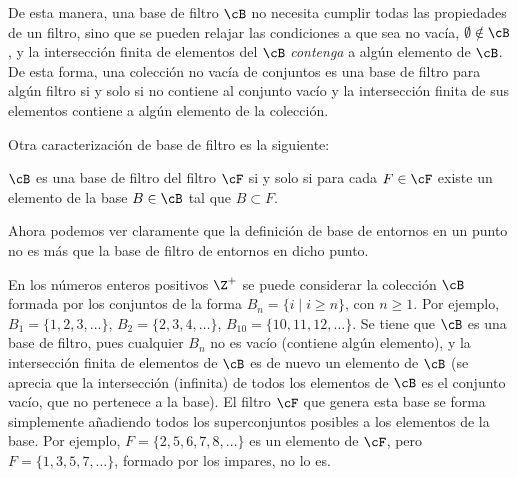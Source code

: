 \begin{amp}
    De esta manera, una base de filtro $\cB$ no necesita cumplir todas las propiedades de un filtro, sino que se pueden relajar las condiciones a que sea no vacía, $\emptyset \notin \cB$, y la intersección finita de elementos del $\cB$ {\it contenga} a algún elemento de $\cB$. De esta forma, una colección no vacía de conjuntos es una base de filtro para algún filtro si y solo si no contiene al conjunto vacío y la intersección finita de sus elementos contiene a algún elemento de la colección.

    \medskip

    Otra caracterización de base de filtro es la siguiente:
    \begin{prop}
        $\cB$ es una base de filtro del filtro $\cF$ si y solo si para cada $F\in \cF$ existe un elemento de la base $B\in\cB$ tal que $B\subset F$.
    \end{prop}    
    Ahora podemos ver claramente que la definición de base de entornos en un punto no es más que la base de filtro de entornos en dicho punto.

    \begin{ej}
        En los números enteros positivos $\Z^+$ se puede considerar la colección $\cB$ formada por los conjuntos de la forma $B_n = \{i \mid i \geq n\}$, con $n\geq 1$. Por ejemplo, $B_1 = \{1,2,3,\ldots\}$, $B_2 = \{2,3,4,\ldots\}$, $B_{10} = \{10,11,12,\ldots\}$. Se tiene que $\cB$ es una base de filtro, pues cualquier $B_n$ no es vacío (contiene algún elemento), y la intersección finita de elementos de $\cB$ es de nuevo un elemento de $\cB$ (se aprecia que la intersección (infinita) de todos los elementos de $\cB$ es el conjunto vacío, que no pertenece a la base). El filtro $\cF$ que genera esta base se forma simplemente añadiendo todos los superconjuntos posibles a los elementos de la base. Por ejemplo, $F = \{2,5,6,7,8,\ldots\}$ es un elemento de $\cF$, pero $F = \{1,3,5,7,\ldots\}$, formado por los impares, no lo es.
    \end{ej}


\end{amp}
